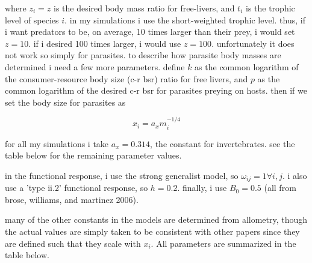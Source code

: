 \documentclass[11pt]{amsart}
\begin{document}
where $z_i=z$ is the desired body mass ratio for free-livers, and $t_{i}$ is the trophic level of species $i$.  in my simulations i use the short-weighted trophic level.  thus, if i want predators to be, on average, 10 times larger than their prey, i would set $z = 10$.  if i desired 100 times larger, i would use $z=100$.  unfortunately it does not work so simply for parasites.  to describe how parasite body masses are determined i need a few more parameters. define $k$ as the common logarithm of the consumer-resource body size (c-r bsr) ratio for free livers, and $p$ as the common logarithm of the desired  c-r bsr for parasites preying on hosts.  then if we set the body size for parasites as 


\begin{equation}
x_i = a_xm_i^{-1/4}\label{xeq}
\end{equation}

for all my simulations i take $a_x = 0.314$, the constant for invertebrates.  see the table below for the remaining parameter values.

in the functional response, i use the strong generalist model, so $\omega_{ij} = 1 \forall i,j$.  i also use a 'type ii.2' functional response, so $h = 0.2$.  finally, i use $B_0 = 0.5$ (all from brose, williams, and martinez 2006).

many of the other constants in the models are determined from allometry, though the actual values are simply taken to be consistent with other papers since they are defined such that they scale with $x_i$.  All parameters are summarized in the table below.
\end{document}
